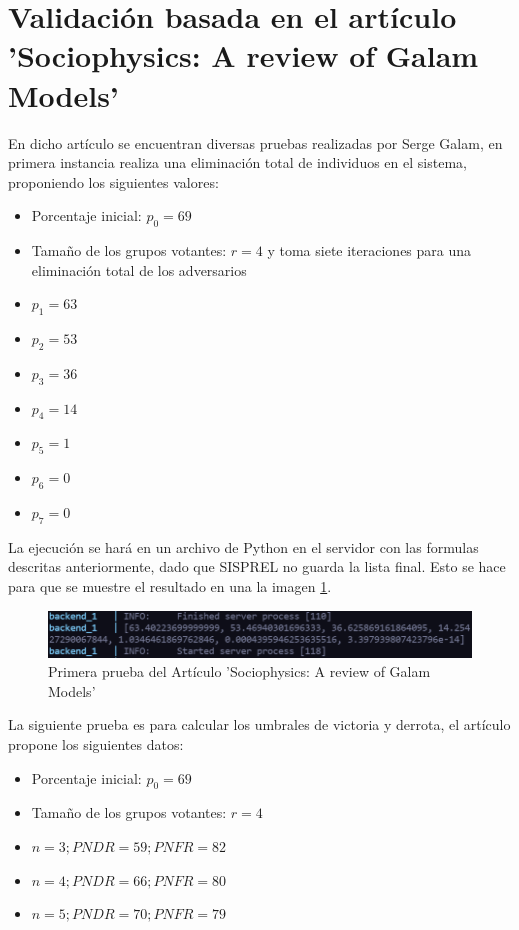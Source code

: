 \clearpage

\section{Validación basada en el artículo 'Sociophysics: A review of Galam Models'}
En dicho artículo se encuentran diversas pruebas realizadas por Serge Galam, en primera instancia realiza una eliminación total de individuos en el sistema, proponiendo los siguientes valores:

\begin{itemize}
    \item Porcentaje inicial: $p_0 = 69$
    \item Tamaño de los grupos votantes: $r = 4$ y toma siete iteraciones para una eliminación total de los adversarios
    \item $p_1 = 63$
    \item $p_2 = 53$
    \item $p_3 = 36$ 
    \item $p_4 = 14$
    \item $p_5 = 1$
    \item $p_6 = 0$
    \item $p_7 = 0$
\end{itemize}

La ejecución se hará en un archivo de Python en el servidor con las formulas descritas anteriormente, dado que SISPREL no guarda la lista final. Esto se hace para que se muestre el resultado en una la imagen \ref{graphic:first_test}.

\begin{figure}[!htb]
    \centering
    \includegraphics[scale=.9]{TT/img/pruebas/first_test_galam.png}
    \caption{Primera prueba del Artículo 'Sociophysics: A review of Galam Models'}
    \label{graphic:first_test}
\end{figure}

La siguiente prueba es para calcular los umbrales de victoria y derrota, el artículo propone los siguientes datos:
\begin{itemize}
    \item Porcentaje inicial: $p_0 = 69$
    \item Tamaño de los grupos votantes: $r = 4$
    \item $n = 3; PNDR = 59; PNFR = 82$
    \item $n = 4; PNDR = 66; PNFR = 80$
    \item $n = 5; PNDR = 70; PNFR = 79$
\end{itemize}

